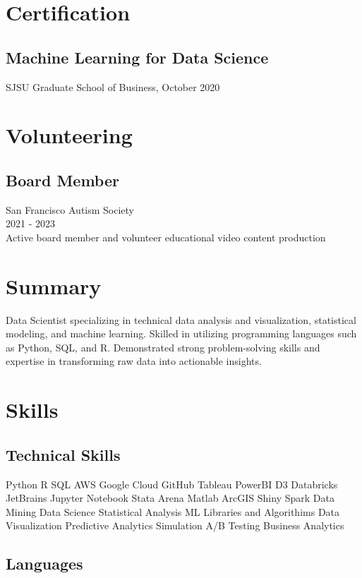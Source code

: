 \documentclass{article}
\begin{document}
\section*{Certification}
\subsection*{Machine Learning for Data Science}
SJSU Graduate School of Business, October 2020

\section*{Volunteering}
\subsection*{Board Member}
San Francisco Autism Society \\
2021 - 2023 \\
Active board member and volunteer educational video content production

\section*{Summary}
Data Scientist specializing in technical data analysis and visualization, statistical modeling, and machine learning. Skilled in utilizing programming languages such as Python, SQL, and R. Demonstrated strong problem-solving skills and expertise in transforming raw data into actionable insights.

\section*{Skills}
\subsection*{Technical Skills}
Python R SQL AWS
Google Cloud GitHub Tableau
PowerBI D3 Databricks JetBrains
Jupyter Notebook Stata Arena
Matlab ArcGIS Shiny Spark
Data Mining Data Science
Statistical Analysis
ML Libraries and Algorithims
Data Visualization Predictive Analytics
Simulation A/B Testing
Business Analytics
\subsection*{Languages}
\end{document}
